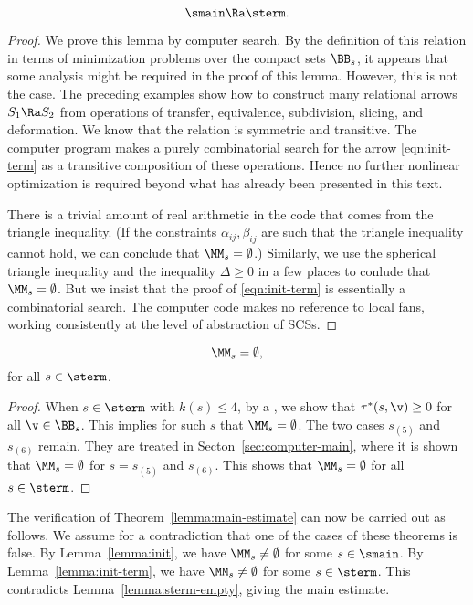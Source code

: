 \begin{lemma}\label{lemma:init-term}
\begin{equation}\label{eqn:init-term}
\smain\Ra \sterm.
\end{equation}
\end{lemma}

\begin{proof}
We prove this lemma by computer search.
   By the definition of this
relation in terms of minimization problems over the compact sets
$\BB_s$,
it appears that some analysis might be required in the proof
of this lemma.  However, this is not the case.  The
preceding
examples show how to construct many relational arrows $S_1\Ra S_2$
from operations of transfer, equivalence, subdivision, slicing, and deformation.
We know that the relation is symmetric and transitive.   The computer
program makes a purely combinatorial search for the arrow
\eqref{eqn:init-term}
as a transitive composition of these operations.  
Hence no further nonlinear optimization is required
beyond
what has already been presented in this text.

There is a trivial amount of real arithmetic in the code that comes
from the triangle inequality.   (If
the constraints $\alpha_{ij},\beta_{ij}$ are such that the triangle
inequality cannot hold, we can conclude that $\MM_s=\emptyset$.)
Similarly, we use the spherical triangle inequality and the inequality
$\Delta\ge0$ in a few places to conlude that $\MM_s=\emptyset$.
But we insist that the proof of \eqref{eqn:init-term} is essentially
a combinatorial search.  The computer code makes no reference
to local fans, working consistently at the level of abstraction of SCSs.
\end{proof}

\begin{lemma}\label{lemma:sterm-empty}
\[
\MM_s=\emptyset,
\]
for all $s\in\sterm$.
\end{lemma}

\begin{proof}
When $s\in \sterm$
with $k(s)\le 4$, by a , we show
that $\tau^*(s,\v) \ge0$ for all $\v\in \BB_s$.  This implies for such $s$
that $\MM_s=\emptyset$.  The two cases $s_{(5)}$ and $s_{(6)}$ remain.
They are treated in Secton~\ref{sec:computer-main}, where it is shown
that $\MM_s=\emptyset$ for $ s=s_{(5)}$ and $s_{(6)}$.  This
shows that $\MM_s=\emptyset$ for all $s\in \sterm$.
\end{proof}

\begin{remark}
The verification of 
Theorem~\ref{lemma:main-estimate}  can now be
carried out as follows.  We assume for a contradiction that
one of the cases of these theorems is false.  By Lemma~\ref{lemma:init}, we have
$\MM_s\ne\emptyset$ for some $s\in \smain$.  
By Lemma~\ref{lemma:init-term}, we have
$\MM_s\ne\emptyset$ for some $s\in \sterm$. 
This contradicts Lemma~\ref{lemma:sterm-empty}, giving
 the main estimate.
\end{remark}

